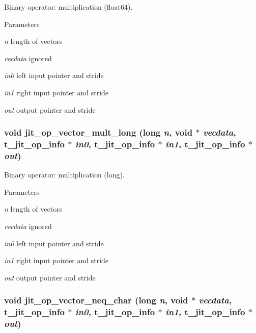 Binary operator: multiplication (float64). 
\begin{DoxyParams}{Parameters}
\item[{\em n}]length of vectors \item[{\em vecdata}]ignored \item[{\em in0}]left input pointer and stride \item[{\em in1}]right input pointer and stride \item[{\em out}]output pointer and stride \end{DoxyParams}
\hypertarget{group__opvecmod_gac48c6a346ad364916edfdcc5604b8279}{
\subsubsection[{jit\_\-op\_\-vector\_\-mult\_\-long}]{\setlength{\rightskip}{0pt plus 5cm}void jit\_\-op\_\-vector\_\-mult\_\-long (long {\em n}, \/  void $\ast$ {\em vecdata}, \/  {\bf t\_\-jit\_\-op\_\-info} $\ast$ {\em in0}, \/  {\bf t\_\-jit\_\-op\_\-info} $\ast$ {\em in1}, \/  {\bf t\_\-jit\_\-op\_\-info} $\ast$ {\em out})}}
\label{group__opvecmod_gac48c6a346ad364916edfdcc5604b8279}


Binary operator: multiplication (long). 
\begin{DoxyParams}{Parameters}
\item[{\em n}]length of vectors \item[{\em vecdata}]ignored \item[{\em in0}]left input pointer and stride \item[{\em in1}]right input pointer and stride \item[{\em out}]output pointer and stride \end{DoxyParams}
\hypertarget{group__opvecmod_ga770d0b1d90b002fa00e2f52fe4915983}{
\subsubsection[{jit\_\-op\_\-vector\_\-neq\_\-char}]{\setlength{\rightskip}{0pt plus 5cm}void jit\_\-op\_\-vector\_\-neq\_\-char (long {\em n}, \/  void $\ast$ {\em vecdata}, \/  {\bf t\_\-jit\_\-op\_\-info} $\ast$ {\em in0}, \/  {\bf t\_\-jit\_\-op\_\-info} $\ast$ {\em in1}, \/  {\bf t\_\-jit\_\-op\_\-info} $\ast$ {\em out})}}
\label{group__opvecmod_ga770d0b1d90b002fa00e2f52fe4915983}


